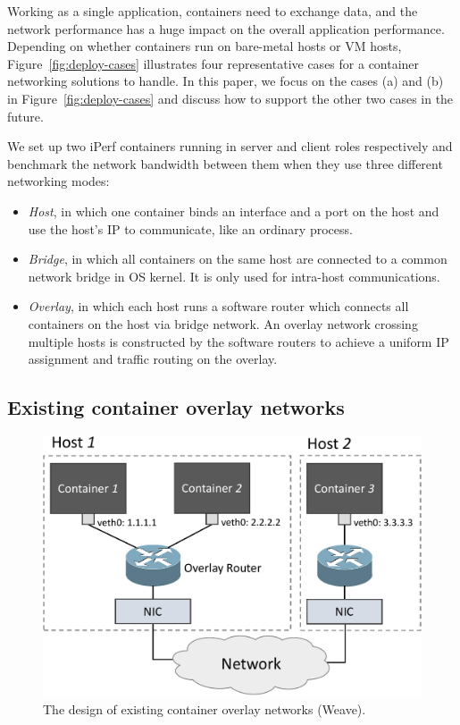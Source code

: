 Working as a single application, containers need to exchange data, and the network performance has a huge impact on the overall application performance.
Depending on whether 
containers run on bare-metal hosts or VM hosts, Figure~\ref{fig:deploy-cases}
illustrates four representative cases for a container networking solutions
to handle. 
In this paper, 
we focus on the cases (a) and (b) in Figure~\ref{fig:deploy-cases} and discuss how to support the other two cases in the future.

We set up two iPerf containers running in server and client roles respectively and benchmark the network bandwidth between them when they use three different networking modes:
\begin{itemize}
	\item {\em Host}, in which one container binds an interface
and a port on the host and use the host's IP to communicate, like an ordinary
process.
	\item {\em Bridge}, in which all containers on the same host are connected to a common network bridge in OS kernel. It is only used for
	intra-host communications.  
	\item {\em Overlay}, in which each host runs a software router which
	connects all containers on the host via bridge network. An overlay 
	network crossing multiple hosts is constructed by the software routers
	to achieve a uniform IP assignment and traffic routing on the overlay.
\end{itemize}


\subsection{Existing container overlay networks}

\begin{figure}[h]  
	\centering   
	\includegraphics[width=0.8\linewidth]{figures/overlay.pdf}   
	\caption{\label{fig:overlay} The design of existing container overlay networks (Weave).}   
\end{figure}   

